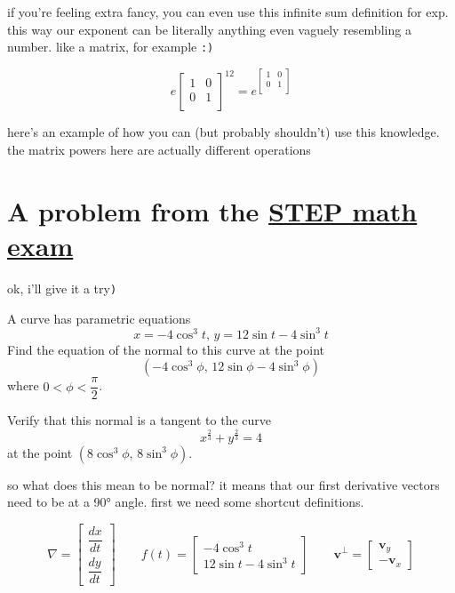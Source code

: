 \documentclass{article}
\begin{document}
  if you're feeling extra fancy, you can even use this infinite sum definition for exp. this way our exponent can be literally anything even vaguely resembling a number. like a matrix, for example \texttt{:)}

  \[
    e\begin{bmatrix}
      1&0\\
      0&1\\
    \end{bmatrix}^{12} =
    e^{\begin{bmatrix}
      1&0\\
      0&1\\
    \end{bmatrix}}
  \]

  here's an example of how you can (but probably shouldn't) use this knowledge. the matrix powers here are actually different operations

  \section{A problem from the \href{https://pmt.physicsandmathstutor.com/download/Admissions/STEP/Papers/2021 STEP 3.pdf}{STEP math exam}}

  ok, i'll give it a try\texttt{)}

  \begin{centerframebox}
    A curve has parametric equations
    \[x = -4 \cos^3 t,\, y = 12 \sin t - 4 \sin^3 t\]
    Find the equation of the normal to this curve at the point
    \[(-4 \cos^3 \phi,\, 12 \sin \phi - 4 \sin^3 \phi)\]
    where $0 <\phi< \dfrac{\pi}{2}$.

    Verify that this normal is a tangent to the curve
    \[x^\frac{2}{3} + y^\frac{2}{3} = 4\]
    at the point $(8 \cos^3 \phi,\, 8 \sin^3 \phi)$.
  \end{centerframebox}

  so what does this mean to be normal? it means that our first derivative vectors need to be at a 90° angle. first we need some shortcut definitions.

  \[
    \nabla = \begin{bmatrix}\dfrac{dx}{dt} \\[4mm]\dfrac{dy}{dt}\end{bmatrix} \qquad
    f(t) = \begin{bmatrix}-4\cos^3t\\12\sin t-4\sin^3t\end{bmatrix} \qquad
    \mathbf{v}^\perp = \begin{bmatrix}\mathbf{v}_y \\ -\mathbf{v}_x\end{bmatrix}
  \]
\end{document}
